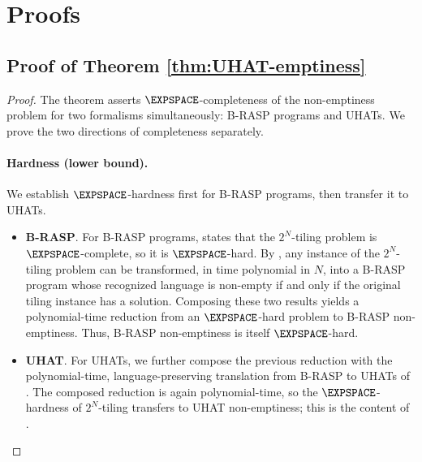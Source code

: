 \documentclass{article} %
\begin{document}



\appendix
\newpage
\section{Proofs}
\label{app:emptiness}
\subsection{Proof of Theorem \ref{thm:UHAT-emptiness}}\label{app:UHAT-emptiness}
\thmUHATemptiness*
\begin{proof}
The theorem asserts $\EXPSPACE$-completeness of the non-emptiness problem for two formalisms simultaneously: B-RASP programs and UHATs. We prove the two directions of completeness separately.

\paragraph{Hardness (lower bound).}
We establish $\EXPSPACE$-hardness first for B-RASP programs, then transfer it to UHATs.
\begin{itemize}[itemsep=1pt, topsep=2pt, parsep=0pt, leftmargin=2em]
    \item \textbf{B-RASP}. For B-RASP programs,  states that the $2^N$-tiling problem is $\EXPSPACE$-complete, so it is $\EXPSPACE$-hard.
By , any instance of the $2^N$-tiling problem can be transformed, in time polynomial in $N$, into a B-RASP program whose recognized language is non-empty if and only if the original tiling instance has a solution. Composing these two results yields a polynomial-time reduction from an $\EXPSPACE$-hard problem to B-RASP non-emptiness.
Thus, B-RASP non-emptiness is itself $\EXPSPACE$-hard.

\item \textbf{UHAT}.
For UHATs, we further compose the previous reduction with the polynomial-time, language-preserving translation from B-RASP to UHATs of . The composed reduction is again polynomial-time, so the $\EXPSPACE$-hardness of $2^N$-tiling transfers to UHAT non-emptiness; this is the content of .
\end{itemize}


\end{proof}
\end{document}
